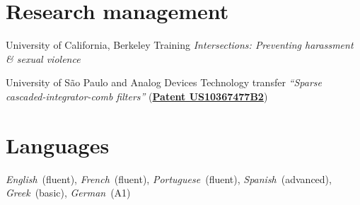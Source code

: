 \documentclass{cvlfoc}
\begin{document}
\begin{entrydate}
\end{entrydate}
\vspace{\entrysep}


\section*{Research management}

\begin{entrydate}
		{University of California, Berkeley}
		{Training}
		{\emph{Intersections: Preventing harassment \& sexual violence}}

		{University of S\~{a}o Paulo {\normalfont and} Analog Devices}
		{Technology transfer}
		{\emph{``Sparse cascaded-integrator-comb filters''}
		(\href{https://patents.google.com/patent/US10367477B2}{\textbf{Patent US10367477B2}})}
\end{entrydate}



\section*{Languages}
\vspace{0.2\baselineskip}

\textit{English}~(fluent),
\textit{French}~(fluent),
\textit{Portuguese}~(fluent),
\textit{Spanish}~(advanced),
\textit{Greek}~(basic),
\textit{German}~(A1)
\end{document}
